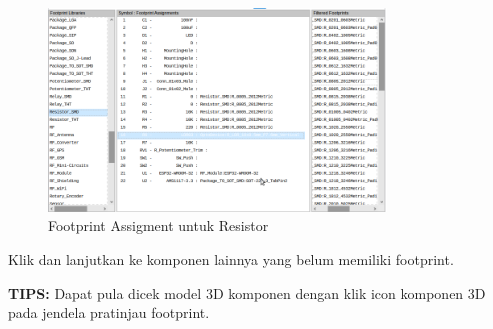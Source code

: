 \documentclass[12pt]{book}
\begin{document}
\begin{enumerate}
		\begin{figure}[!ht]
			\centering
			\includegraphics[width=0.8\textwidth]{images/fpa/fpa_6}
			\caption{Footprint Assigment untuk Resistor}
		\end{figure}

		Klik  dan lanjutkan ke komponen lainnya
		yang belum memiliki footprint.

	\end{enumerate}

	\textbf{TIPS:} Dapat pula dicek model 3D komponen dengan klik icon komponen 3D pada jendela pratinjau footprint.
\end{document}
